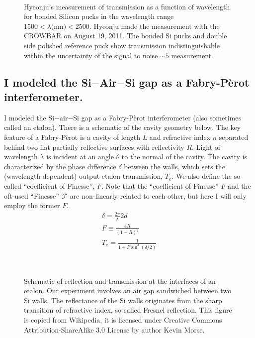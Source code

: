\begin{figure}[h!] 
\begin{center}
\ 
\caption[Hyeonju's transmission experiment]{Hyeonju's measurement of transmission as a function of wavelength for bonded Silicon pucks in the wavelength range $1500 < \lambda \textrm{(nm)} < 2500 $.  Hyeonju made the measurement with the CROWBAR on August 19, 2011.  The bonded Si pucks and double side polished reference puck show transmission indistinguishable within the uncertainty of the signal to noise $\sim5$ measurement.}
\label{fig:hyeonju-trans}
\end{center}
\end{figure}

\subsection{I modeled the Si$-$Air$-$Si gap as a Fabry-P\`{e}rot interferometer.}
I modeled the Si$-$air$-$Si gap as a Fabry-P\`{e}rot interferometer (also sometimes called an etalon).  There is a schematic of the cavity geometry below.  The key feature of a Fabry-P\`{e}rot is a cavity of length $L$ and refractive index $n$ separated behind two flat partially reflective surfaces with reflectivity $R$.  Light of wavelength $\lambda$ is incident at an angle $\theta$ to the normal of the cavity.  The cavity is characterized by the phase difference $\delta$ between the walls, which sets the (wavelength-dependent) output etalon transmission, $T_e$.  We also define the so-called ``coefficient of Finesse'', $F$.  Note that the ``coefficient of Finesse'' $F$ and the oft-used ``Finesse'' $\mathcal{F}$ are non-linearly related to each other, but here I will only employ the former $F$.
\begin{eqnarray}
 \delta = \frac{2\pi}{\lambda}2d \\
  F \equiv \frac{4R}{(1-R)^2} \\
 T_e = \frac{1}{1+F\sin^2(\delta/2)}  \label{eq:FabPerot}
\end{eqnarray}

\begin{figure}[h!] 
\begin{center}
\ 
\caption[Etalon schematic]{Schematic of reflection and transmission at the interfaces of an etalon.  Our experiment involves an air gap sandwiched between two Si walls.  The reflectance of the Si walls originates from the sharp transition of refractive index, so called Fresnel reflection.  This figure is copied from Wikipedia, it is licensed under Creative Commons Attribution-ShareAlike 3.0 License by author Kevin Morse.}
\label{fig:etalon}
\end{center}
\end{figure}

